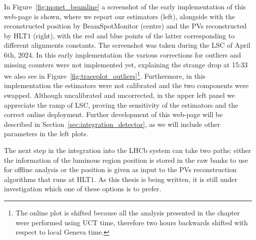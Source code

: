 In Figure~\ref{fig:monet_beamline} a screenshot of the early implementation of this web-page is shown, where we report our estimators (left), alongside with the reconstructed position by BeamSpotMonitor (centre) and the PVs reconstructed by HLT$1$ (right), with the red and blue points of the latter corresponding to different alignments constants. The screenshot was taken during the LSC of April 6th, 2024. In this early implementation the various corrections for outliers and missing counters were not implemented yet, explaining the strange drop at 15:33 we also see in Figure~\ref{fig:traceplot_outliers}\footnote{The online plot is shifted because all the analysis presented in the chapter were performed using UCT time, therefore two hours backwards shifted with respect to local Geneva time.}. Furthermore, in this implementation the estimators were not calibrated and the two components were swapped. Although uncalibrated and uncorrected, in the upper left panel we appreciate the ramp of LSC, proving the sensitivity of the estimators and the correct online deployment.
Further development of this web-page will be described in Section~\ref{sec:integration_detector}, as we will include other parameters in the left plots.

The next step in the integration into the LHCb system can take two paths: either the information of the luminous region position is stored in the raw banks to use for offline analysis or the position is given as input to the PVs reconstruction algorithms that runs at HLT$1$. As this thesis is being written, it is still under investigation which one of these options is to prefer.